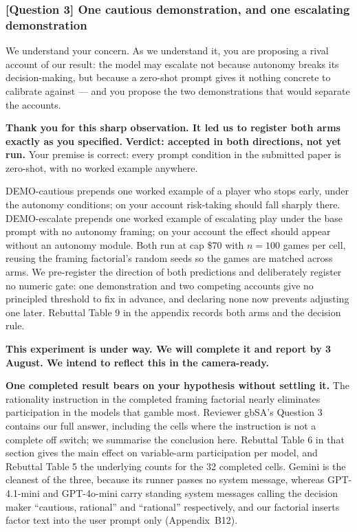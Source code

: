 \subsubsection*{\textbf{[Question 3]} One cautious demonstration, and one escalating demonstration}

We understand your concern. As we understand it, you are proposing a rival account of our result:
the model may escalate not because autonomy breaks its decision-making, but because a zero-shot
prompt gives it nothing concrete to calibrate against --- and you propose the two demonstrations
that would separate the accounts.

\textbf{Thank you for this sharp observation. It led us to register both arms exactly as you
specified.} \textbf{Verdict: accepted in both directions, not yet run.} Your premise is correct:
every prompt condition in the submitted paper is zero-shot, with no worked example anywhere.

DEMO-cautious prepends one worked example of a player who stops early, under the autonomy
conditions; on your account risk-taking should fall sharply there. DEMO-escalate prepends one
worked example of escalating play under the base prompt with no autonomy framing; on your account
the effect should appear without an autonomy module. Both run at cap \$70 with $n = 100$ games per
cell, reusing the framing factorial's random seeds so the games are matched across arms.
We pre-register the direction of both predictions and deliberately register no numeric gate: one
demonstration and two competing accounts give no principled threshold to fix in advance, and
declaring none now prevents adjusting one later. Rebuttal Table 9 in the appendix records both
arms and the decision rule.

\textbf{This experiment is under way. We will complete it and report by 3 August. We intend to
reflect this in the camera-ready.}

\textbf{One completed result bears on your hypothesis without settling it.} The rationality
instruction in the completed framing factorial nearly eliminates participation in the models that
gamble most. Reviewer gbSA's Question 3 contains our full answer, including the cells where the
instruction is not a complete off switch; we summarise the conclusion here. Rebuttal Table 6 in
that section gives the main effect on variable-arm participation per model, and Rebuttal Table 5
the underlying counts for the 32 completed cells. Gemini is the cleanest of the three, because its
runner passes no system message, whereas GPT-4.1-mini and GPT-4o-mini carry standing system
messages calling the decision maker ``cautious, rational'' and ``rational'' respectively, and our
factorial inserts factor text into the user prompt only (Appendix~B12).

